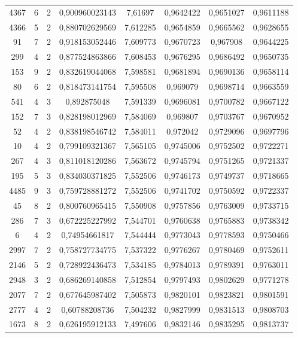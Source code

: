 \begin{longtable}{|c|c|c|c|c|c|c|c|}
4367 & 6 & 2 & 0,900960023143 & 7,61697 & 0,9642422 & 0,9651027 & 0,9611188 \\
4366 & 5 & 2 & 0,880702629569 & 7,612285 & 0,9654859 & 0,9665562 & 0,9628655 \\
91 & 7 & 2 & 0,918153052446 & 7,609773 & 0,9670723 & 0,967908 & 0,9644225 \\
299 & 4 & 2 & 0,877524863866 & 7,608453 & 0,9676295 & 0,9686492 & 0,9650735 \\
153 & 9 & 2 & 0,832619044068 & 7,598581 & 0,9681894 & 0,9690136 & 0,9658114 \\
80 & 6 & 2 & 0,818473141754 & 7,595508 & 0,969079 & 0,9698714 & 0,9663559 \\
541 & 4 & 3 & 0,892875048 & 7,591339 & 0,9696081 & 0,9700782 & 0,9667122 \\
152 & 7 & 3 & 0,828198012969 & 7,584069 & 0,969807 & 0,9703767 & 0,9670952 \\
52 & 4 & 2 & 0,838198546742 & 7,584011 & 0,972042 & 0,9729096 & 0,9697796 \\
10 & 4 & 2 & 0,799109321367 & 7,565105 & 0,9745006 & 0,9752502 & 0,9722271 \\
267 & 4 & 3 & 0,811018120286 & 7,563672 & 0,9745794 & 0,9751265 & 0,9721337 \\
195 & 5 & 3 & 0,834030371825 & 7,552506 & 0,9746173 & 0,9749737 & 0,9718665 \\
4485 & 9 & 3 & 0,759728881272 & 7,552506 & 0,9741702 & 0,9750592 & 0,9722337 \\
45 & 8 & 2 & 0,800760965415 & 7,550908 & 0,9757856 & 0,9763009 & 0,9733715 \\
286 & 7 & 3 & 0,672225227992 & 7,544701 & 0,9760638 & 0,9765883 & 0,9738342 \\
6 & 4 & 2 & 0,74954661817 & 7,544444 & 0,9773043 & 0,9778593 & 0,9750466 \\
2997 & 7 & 2 & 0,758727734775 & 7,537322 & 0,9776267 & 0,9780469 & 0,9752611 \\
2146 & 5 & 2 & 0,728922436473 & 7,534185 & 0,9784013 & 0,9789391 & 0,9763011 \\
2948 & 3 & 2 & 0,686269140858 & 7,512854 & 0,9797493 & 0,9802629 & 0,9771278 \\
2077 & 7 & 2 & 0,677645987402 & 7,505873 & 0,9820101 & 0,9823821 & 0,9801591 \\
2777 & 4 & 2 & 0,60788208736 & 7,504232 & 0,9827999 & 0,9831513 & 0,9808703 \\
1673 & 8 & 2 & 0,626195912133 & 7,497606 & 0,9832146 & 0,9835295 & 0,9813737 \\

\end{longtable}
